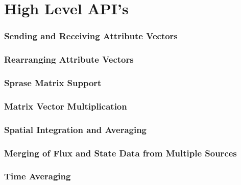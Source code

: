 \documentclass{article}
\begin{document}
\part{High Level API's}
%
\section{Sending and Receiving Attribute Vectors}

\vspace*{\fill}
\newpage
%
\section{Rearranging Attribute Vectors}

\vspace*{\fill}
\newpage
%
\section{Sprase Matrix Support}

\vspace*{\fill}
\newpage
%

\vspace*{\fill}
\newpage
%

\vspace*{\fill}
\newpage
%

\vspace*{\fill}
\newpage
%

\vspace*{\fill}
\newpage
%
%
\section{Matrix Vector Multiplication}

\vspace*{\fill}
\newpage
%
\section{Spatial Integration and Averaging}

\vspace*{\fill}
\newpage

\vspace*{\fill}
\newpage
%
\section{Merging of Flux and State Data from Multiple Sources}

\vspace*{\fill}
\newpage
%
\section{Time Averaging}

\vspace*{\fill}
\newpage
%

\vspace*{\fill}
\newpage
%
\end{document}
